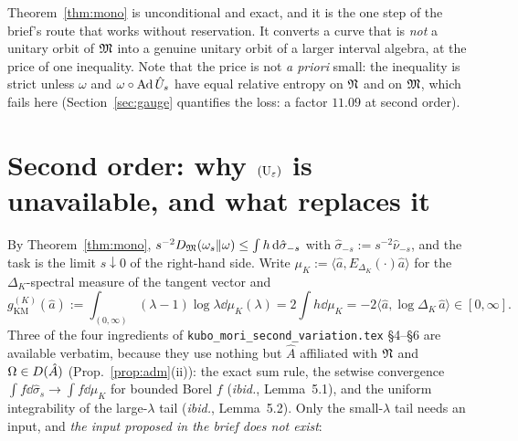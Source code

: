 \documentclass[11pt]{article}
\newcommand{\ip}[2]{\langle#1,#2\rangle}\newcommand{\norm}[1]{\lVert#1\rVert}
\newcommand{\gKM}{g_{\mathrm{KM}}}\newcommand{\gB}{g_{\mathrm B}}
\begin{document}
\begin{verdictok}
Theorem~\ref{thm:mono} is unconditional and exact, and it is the one step of the brief's route that works
without reservation.  It converts a curve that is \emph{not} a unitary orbit of $\mathfrak M$ into a genuine unitary
orbit of a larger interval algebra, at the price of one inequality.  Note that the price is not
\emph{a priori} small: the inequality is strict unless $\omega$ and $\omega\circ\operatorname{Ad}\hat U_s$ have equal
relative entropy on $\mathfrak N$ and on $\mathfrak M$, which fails here (Section~\ref{sec:gauge} quantifies the loss:
a factor $11.09$ at second order).
\end{verdictok}

\section{Second order: why $(\mathrm U_\varepsilon)$ is unavailable, and what replaces it}\label{sec:second}

By Theorem~\ref{thm:mono}, $s^{-2}D_{\mathfrak M}(\omega_s\Vert\omega)\le\int h\,\mathrm d\hat\sigma_{-s}$ with
$\hat\sigma_{-s}:=s^{-2}\hat\nu_{-s}$, and the task is the limit $s\downarrow0$ of the right-hand side.  Write
$\mu_K:=\ip{\hat a}{E_{\Delta_K}(\cdot)\hat a}$ for the $\Delta_K$-spectral measure of the tangent vector and
\begin{equation}\label{eq:gKMK}
 \gKM^{(K)}(\hat a):=\int_{(0,\infty)}(\lambda-1)\log\lambda\dd\mu_K(\lambda)
 =2\int h\dd\mu_K=-2\ip{\hat a}{\log\Delta_K\,\hat a}\in[0,\infty] .
\end{equation}
Three of the four ingredients of \texttt{kubo\_mori\_second\_variation.tex} \S4--\S6 are available verbatim,
because they use nothing but $\hat A$ affiliated with $\mathfrak N$ and $\Omega\in D(\hat A)$
(Prop.~\ref{prop:adm}(ii)): the exact sum rule, the setwise convergence
$\int f\dd\hat\sigma_s\to\int f\dd\mu_K$ for bounded Borel $f$ (\emph{ibid.}, Lemma~5.1), and the
uniform integrability of the large-$\lambda$ tail (\emph{ibid.}, Lemma~5.2).  Only the small-$\lambda$ tail
needs an input, and \emph{the input proposed in the brief does not exist}:
\end{document}
